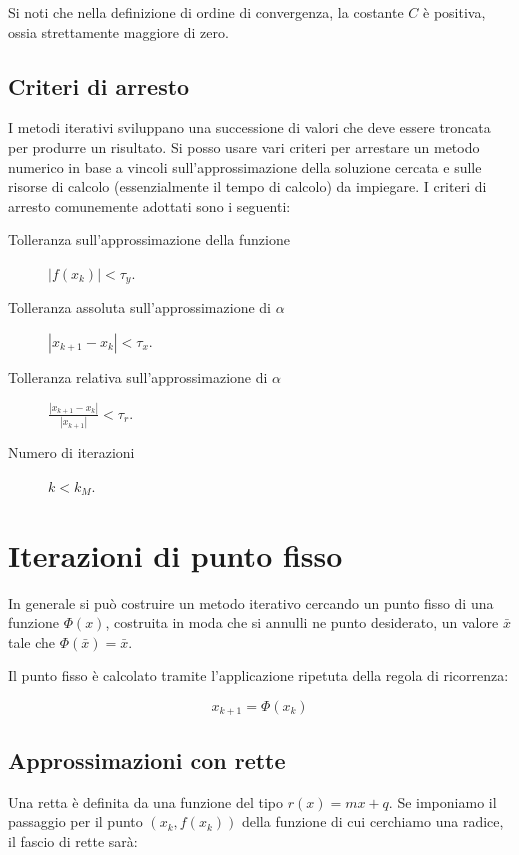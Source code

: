 \documentclass[12pt]{article}
\theoremstyle{plain}%
\theoremstyle{definition}
\theoremstyle{remark}
\begin{document}
Si noti che nella definizione di ordine di convergenza, la costante $C$
è positiva, ossia strettamente maggiore di zero.

\subsection{Criteri di arresto}

I metodi iterativi sviluppano una successione di valori che deve essere troncata
per produrre un risultato.
Si posso usare vari criteri per arrestare un metodo numerico in base a vincoli
sull'approssimazione della soluzione cercata e sulle risorse di calcolo
(essenzialmente il tempo di calcolo) da impiegare.
I criteri di arresto comunemente adottati sono i seguenti:

\begin{description}
\item[Tolleranza sull'approssimazione della funzione]$|f(x_k)| < \tau_y$.
\item[Tolleranza assoluta sull'approssimazione di $\alpha$] $|x_{k + 1} - x_{k}| < \tau_x$.
\item[Tolleranza relativa sull'approssimazione di $\alpha$] $\frac{|x_{k + 1} - x_{k}|}{|x_{k+1}|} < \tau_r$.
\item[Numero di iterazioni] $k < k_M$. 
\end{description}




\section{Iterazioni di punto fisso}

In generale si può costruire un metodo iterativo cercando un punto fisso di una funzione $\Phi(x)$,
costruita in moda che si annulli ne punto desiderato, un valore $\bar{x}$ tale che $\Phi(\bar{x}) = \bar{x}$.

Il punto fisso è calcolato tramite l'applicazione ripetuta della regola di ricorrenza:

$$x_{k+1} = \Phi(x_k)$$

\subsection{Approssimazioni con rette}

Una retta è definita da una funzione del tipo $r(x) = m x + q$.
Se imponiamo il passaggio per il punto $(x_k, f(x_k))$ della funzione di cui cerchiamo una radice, il fascio di rette sarà:
\end{document}
